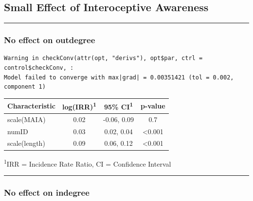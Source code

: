 \documentclass[
  .7em,
  letterpaper,
  DIV=11,
  numbers=noendperiod]{scrartcl}
\begin{document}
\hypertarget{small-effect-of-interoceptive-awareness}{%
\subsection{Small Effect of Interoceptive
Awareness}\label{small-effect-of-interoceptive-awareness}}

\begin{center}\rule{0.5\linewidth}{0.5pt}\end{center}

\hypertarget{no-effect-on-outdegree-6}{%
\subsubsection{No effect on outdegree}\label{no-effect-on-outdegree-6}}

\begin{verbatim}
Warning in checkConv(attr(opt, "derivs"), opt$par, ctrl = control$checkConv, :
Model failed to converge with max|grad| = 0.00351421 (tol = 0.002, component 1)
\end{verbatim}

\captionsetup[table]{labelformat=empty,skip=1pt}
\setlength{\LTpost}{0mm}
\begin{longtable}{lccc}
\toprule
\textbf{Characteristic} & \textbf{log(IRR)}\textsuperscript{1} & \textbf{95\% CI}\textsuperscript{1} & \textbf{p-value} \\ 
\midrule
scale(MAIA) & 0.02 & -0.06, 0.09 & 0.7 \\ 
numID & 0.03 & 0.02, 0.04 & <0.001 \\ 
scale(length) & 0.09 & 0.06, 0.12 & <0.001 \\ 
\bottomrule
\end{longtable}
\begin{minipage}{\linewidth}
\textsuperscript{1}IRR = Incidence Rate Ratio, CI = Confidence Interval\\
\end{minipage}

\begin{center}\rule{0.5\linewidth}{0.5pt}\end{center}

\hypertarget{no-effect-on-indegree-5}{%
\subsubsection{No effect on indegree}\label{no-effect-on-indegree-5}}
\end{document}
